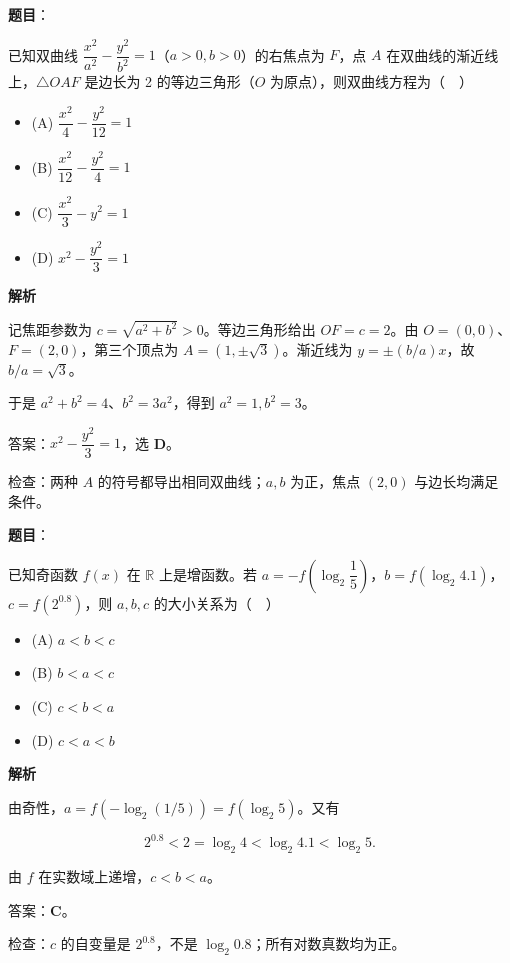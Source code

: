 \begin{answer}

\textbf{题目}：

已知双曲线 $\dfrac{x^2}{a^2}-\dfrac{y^2}{b^2}=1$（$a>0,b>0$）的右焦点为 $F$，点 $A$ 在双曲线的渐近线上，$\triangle OAF$ 是边长为 2 的等边三角形（$O$ 为原点），则双曲线方程为（　）

\begin{itemize}
\item (A) $\dfrac{x^2}{4}-\dfrac{y^2}{12}=1$
\item (B) $\dfrac{x^2}{12}-\dfrac{y^2}{4}=1$
\item (C) $\dfrac{x^2}{3}-y^2=1$
\item (D) $x^2-\dfrac{y^2}{3}=1$
\end{itemize}

\textbf{解析}

记焦距参数为 $c=\sqrt{a^2+b^2}>0$。等边三角形给出 $OF=c=2$。由 $O=(0,0)$、$F=(2,0)$，第三个顶点为 $A=(1,\pm\sqrt3)$。渐近线为 $y=\pm(b/a)x$，故 $b/a=\sqrt3$。

于是 $a^2+b^2=4$、$b^2=3a^2$，得到 $a^2=1,b^2=3$。

答案：$\boxed{x^2-\dfrac{y^2}{3}=1}$，选 \textbf{D}。

检查：两种 $A$ 的符号都导出相同双曲线；$a,b$ 为正，焦点 $(2,0)$ 与边长均满足条件。


\end{answer}
\begin{answer}

\textbf{题目}：

已知奇函数 $f(x)$ 在 $\mathbb R$ 上是增函数。若 $a=-f\left(\log_2\dfrac15\right)$，$b=f(\log_2 4.1)$，$c=f(2^{0.8})$，则 $a,b,c$ 的大小关系为（　）

\begin{itemize}
\item (A) $a<b<c$
\item (B) $b<a<c$
\item (C) $c<b<a$
\item (D) $c<a<b$
\end{itemize}

\textbf{解析}

由奇性，$a=f(-\log_2(1/5))=f(\log_2 5)$。又有

\nopagebreak[4]
\[2^{0.8}<2=\log_2 4<\log_2 4.1<\log_2 5.\]

由 $f$ 在实数域上递增，$c<b<a$。

答案：\textbf{C}。

检查：$c$ 的自变量是 $2^{0.8}$，不是 $\log_2 0.8$；所有对数真数均为正。


\end{answer}
